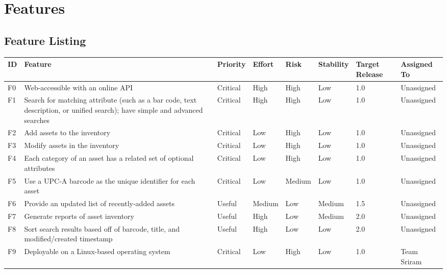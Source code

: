 \documentclass{article}
\begin{document}
\section{Features}
\subsection{Feature Listing}
\begin{tabular}{ | p{0.15in} | p{2.0in} | p{0.5in} | p{0.5in} | p{0.5in} | p{0.6in} | p{0.5in} | p{0.65in} | }
\hline
\textbf{ID} & \textbf{Feature} & \textbf{Priority} & \textbf{Effort} & \textbf{Risk} & \textbf{Stability} & \textbf{Target Release} & \textbf{Assigned To} \\
\hline
\hline
F0 & Web-accessible with an online API & Critical & High & High & Low & 1.0 & Unassigned \\
\hline
F1 & Search for matching attribute (such as a bar code, text description, or unified search); have simple and advanced searches & Critical & High & High & Low & 1.0 & Unassigned \\
\hline
F2 & Add assets to the inventory & Critical & Low & High & Low & 1.0 & Unassigned \\
\hline
F3 & Modify assets in the inventory & Critical & Low & High & Low & 1.0 & Unassigned \\
\hline
F4 & Each category of an asset has a related set of optional attributes & Critical & Low & High & Low & 1.0 & Unassigned \\
\hline
F5 & Use a UPC-A barcode as the unique identifier for each asset & Critical & Low & Medium & Low & 1.0 & Unassigned \\
\hline
F6 & Provide an updated list of recently-added assets & Useful & Medium & Low & Medium & 1.5 & Unassigned \\
\hline
F7 & Generate reports of asset inventory & Useful & High & Low & Medium & 2.0 & Unassigned \\
\hline
F8 & Sort search results based off of barcode, title, and modified/created timestamp & Useful & High & Low & Low & 2.0 & Unassigned \\
\hline
F9 & Deployable on a Linux-based operating system & Critical & Low & High & Low & 1.0 & Team Sriram \\
\hline
\end{tabular}\\
~\\
~\\
\end{document}
